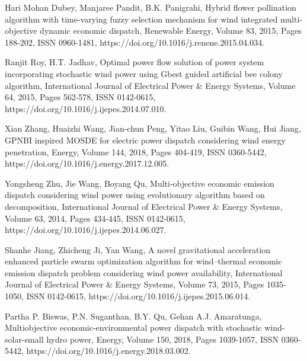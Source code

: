 \begin{thebibliography}{99}
\begin{singlespace}

 Hari Mohan Dubey, Manjaree Pandit, B.K. Panigrahi, Hybrid flower pollination algorithm with time-varying fuzzy selection mechanism for wind integrated multi-objective dynamic economic dispatch, Renewable Energy, Volume 83, 2015, Pages 188-202, ISSN 0960-1481, https://doi.org/10.1016/j.renene.2015.04.034.

 Ranjit Roy, H.T. Jadhav, Optimal power flow solution of power system incorporating stochastic wind power using Gbest guided artificial bee colony algorithm, International Journal of Electrical Power \& Energy Systems, Volume 64, 2015, Pages 562-578, ISSN 0142-0615, https://doi.org/10.1016/j.ijepes.2014.07.010.

 Xian Zhang, Huaizhi Wang, Jian-chun Peng, Yitao Liu, Guibin Wang, Hui Jiang, GPNBI inspired MOSDE for electric power dispatch considering wind energy penetration, Energy, Volume 144, 2018, Pages 404-419, ISSN 0360-5442, https://doi.org/10.1016/j.energy.2017.12.005.

 Yongsheng Zhu, Jie Wang, Boyang Qu, Multi-objective economic emission dispatch considering wind power using evolutionary algorithm based on decomposition, International Journal of Electrical Power \& Energy Systems, Volume 63, 2014, Pages 434-445, ISSN 0142-0615, https://doi.org/10.1016/j.ijepes.2014.06.027.

 Shanhe Jiang, Zhicheng Ji, Yan Wang, A novel gravitational acceleration enhanced particle swarm optimization algorithm for wind–thermal economic emission dispatch problem considering wind power availability, International Journal of Electrical Power \& Energy Systems, Volume 73, 2015, Pages 1035-1050, ISSN 0142-0615, https://doi.org/10.1016/j.ijepes.2015.06.014.

 Partha P. Biswas, P.N. Suganthan, B.Y. Qu, Gehan A.J. Amaratunga, Multiobjective economic-environmental power dispatch with stochastic wind-solar-small hydro power, Energy, Volume 150, 2018, Pages 1039-1057, ISSN 0360-5442, https://doi.org/10.1016/j.energy.2018.03.002.


\end{singlespace}
\end{thebibliography}

